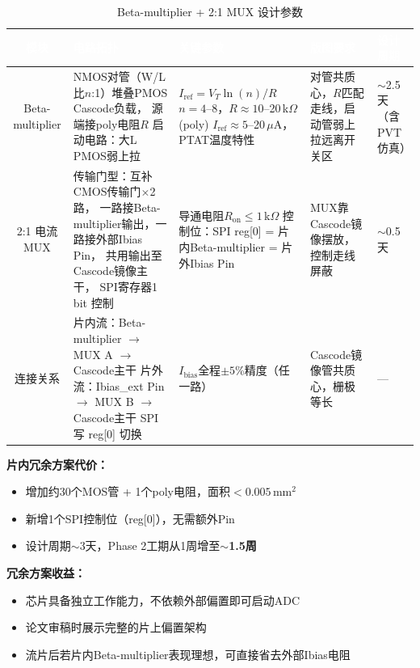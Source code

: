 \documentclass[12pt,a4paper,fontset=none]{ctexart}
\begin{document}
\begin{table}[H]
\centering
\caption{Beta-multiplier + 2:1 MUX 设计参数}
\scriptsize
\begin{tabular}{@{}cL{2.2cm}L{3.6cm}L{3.6cm}L{2.8cm}@{}}
\toprule
{}
\textcolor{white}{\textbf{模块}} &
\textcolor{white}{\textbf{电路拓扑}} &
\textcolor{white}{\textbf{关键参数}} &
\textcolor{white}{\textbf{版图要求}} &
\textcolor{white}{\textbf{设计周期}} \\
\midrule
Beta-multiplier &
NMOS对管（W/L比$n$:1）堆叠PMOS Cascode负载，
源端接poly电阻$R$ \newline
启动电路：大L PMOS弱上拉 &
$I_{\mathrm{ref}} = V_T \ln(n) / R$\newline
$n=4$--8，$R\approx10$--20\,k$\Omega$ (poly)\newline
$I_{\mathrm{ref}}\approx5$--20\,$\mu$A，PTAT温度特性 &
对管共质心，$R$匹配走线，启动管弱上拉远离开关区 &
$\sim$2.5天（含PVT仿真） \\
:1 电流 MUX &
传输门型：互补CMOS传输门$\times$2路，
一路接Beta-multiplier输出，一路接外部Ibias Pin，
共用输出至Cascode镜像主干，
SPI寄存器1 bit 控制 &
导通电阻$R_{\mathrm{on}}\le1$\,k$\Omega$\newline
控制位：SPI reg[0] = 片内Beta-multiplier = 片外Ibias Pin &
MUX靠Cascode镜像摆放，控制走线屏蔽 &
$\sim$0.5天 \\
\midrule
连接关系 &
片内流：Beta-multiplier $\to$ MUX A $\to$ Cascode主干\newline
片外流：Ibias\_ext Pin $\to$ MUX B $\to$ Cascode主干\newline
SPI 写 reg[0] 切换 &
$I_{\mathrm{bias}}$全程$\pm5$\%精度（任一路） &
Cascode镜像管共质心，栅极等长 & — \\
\bottomrule
\end{tabular}
\end{table}

\textbf{片内冗余方案代价：}
\begin{itemize}[leftmargin=*,nosep]
    \item 增加约30个MOS管 + 1个poly电阻，面积$<0.005$\,mm$^2$
    \item 新增1个SPI控制位（reg[0]），无需额外Pin
    \item 设计周期$\sim$3天，Phase 2工期从1周增至\textbf{$\sim$1.5周}
\end{itemize}

\textbf{冗余方案收益：}
\begin{itemize}[leftmargin=*,nosep]
    \item 芯片具备独立工作能力，不依赖外部偏置即可启动ADC
    \item 论文审稿时展示完整的片上偏置架构
    \item 流片后若片内Beta-multiplier表现理想，可直接省去外部Ibias电阻
\end{itemize}
\end{document}
